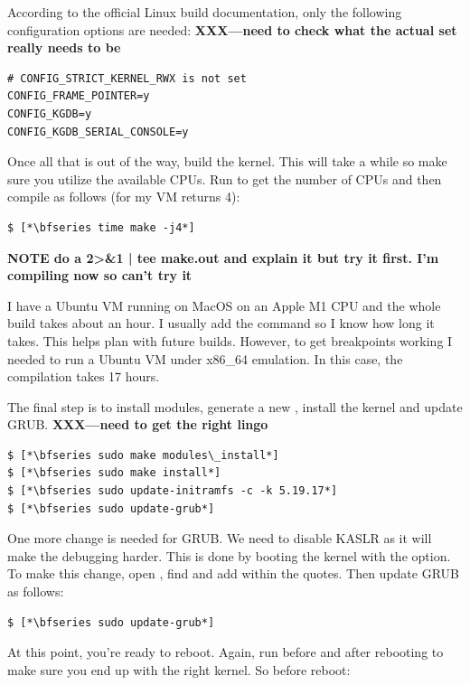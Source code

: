 \noindent
According to the official Linux build documentation, only the following configuration options are needed: \textbf{XXX---need to check what the actual set really needs to be}

\begin{lstlisting}
# CONFIG_STRICT_KERNEL_RWX is not set
CONFIG_FRAME_POINTER=y
CONFIG_KGDB=y
CONFIG_KGDB_SERIAL_CONSOLE=y
\end{lstlisting}

\noindent
Once all that is out of the way, build the kernel. This will take a while so make sure you utilize the available CPUs. Run  to get the number of CPUs and then compile as follows (for my VM  returns 4):

\begin{lstlisting}
$ [*\bfseries time make -j4*]
\end{lstlisting}

\textbf{NOTE do a 2>\&1 | tee make.out and explain it but try it first. I'm compiling now so can't try it}

\noindent
I have a Ubuntu VM running on MacOS on an Apple M1 CPU and the whole build takes about an hour. I usually add the  command so I know how long it takes. This helps plan with future builds. However, to get breakpoints working I needed to run a Ubuntu VM under x86\_64 emulation. In this case, the compilation takes 17 hours.

The final step is to install modules, generate a new , install the kernel and update GRUB. \textbf{XXX---need to get the right lingo}

\begin{lstlisting}
$ [*\bfseries sudo make modules\_install*]
$ [*\bfseries sudo make install*]
$ [*\bfseries sudo update-initramfs -c -k 5.19.17*]
$ [*\bfseries sudo update-grub*]
\end{lstlisting}

\noindent
One more change is needed for GRUB. We need to disable KASLR as it will make the debugging harder. This is done by booting the kernel with the  option. To make this change, open , find  and add  within the quotes. Then update GRUB as follows:

\begin{lstlisting}
$ [*\bfseries sudo update-grub*]
\end{lstlisting}

\noindent
At this point, you're ready to reboot.  Again, run  before and after rebooting to make sure you end up with the right kernel. So before reboot:

